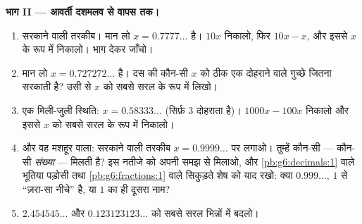 \begin{problem}
\medskip
\noindent\textbf{भाग II --- आवर्ती दशमलव से वापस  तक।}
\begin{enumerate}[resume]
  \item सरकाने वाली तरकीब। मान लो $x = 0.7777\ldots$ है। $10x$
        निकालो, फिर $10x - x$, और इससे $x$  के रूप में
        निकालो। भाग देकर जाँचो।
  \item मान लो $x = 0.727272\ldots$ है। दस की कौन-सी  $x$ को
        ठीक एक दोहराने वाले गुच्छे जितना सरकाती है? उसी से $x$ को
        सबसे सरल  के रूप में लिखो।
  \item एक मिली-जुली स्थिति: $x = 0.58333\ldots$ (सिर्फ़ $3$
        दोहराता है)। $1000x - 100x$ निकालो और इससे $x$ को सबसे
        सरल  के रूप में निकालो।
  \item और वह मशहूर वाला: सरकाने वाली तरकीब
        $x = 0.9999\ldots$ पर लगाओ। तुम्हें कौन-सी  ---
        कौन-सी \emph{संख्या} --- मिलती है? इस नतीजे को अपनी समझ से
        मिलाओ, और \cref{pb:g6:decimals:1} वाले भूतिया पड़ोसी तथा
        \cref{pb:g6:fractions:1} वाले सिकुड़ते शेष को याद रखो: क्या
        $0.999\ldots$, $1$ से ``ज़रा-सा नीचे'' है, या $1$ का ही
        दूसरा नाम?
  \item $2.454545\ldots$ और $0.123123123\ldots$ को सबसे सरल
        भिन्नों में बदलो।
\end{enumerate}


\end{problem}
